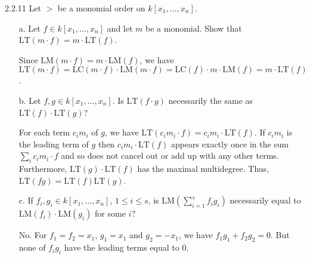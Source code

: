 \documentclass[12pt]{article}
\newcommand{\lt}{\text{LT}}
\newcommand{\lm}{\text{LM}}
\newcommand{\lc}{\text{LC}}
\begin{document}
2.2.11
Let $>$ be a monomial order on $k[x_1,\ldots, x_n].$
\begin{enumerate}
    \item[a.] Let $f\in k[x_1,\ldots, x_n]$ and let $m$ be a monomial. Show that $\text{LT}(m\cdot f)= m\cdot \text{LT}(f)$.
    \begin{mybox}
        Since $\lm(m\cdot f)=m\cdot\lm(f)$,
        we have $\lt(m\cdot f)=\lc(m\cdot f)\cdot
        \lm(m\cdot f)=\lc(f)\cdot m \cdot \lm(f)
        =m\cdot \lt(f)$.
    \end{mybox}
    \item[b.] Let $f,g\in k[x_1,\ldots, x_n]$. Is $\text{LT}(f\cdot g)$ necessarily the same as $\text{LT}(f)\cdot\text{LT}(g)$?
    \begin{mybox}
        For each term $c_im_i$ of $g$, we have
        $\lt(c_im_i\cdot f)= c_im_i\cdot\lt(f)$.
        If $c_im_i$ is the leading term of $g$ then
        $c_im_i\cdot\lt(f)$ appears exactly once in the
        sum $\sum_{i}{c_im_i\cdot f}$ and so does not
        cancel out or add up with any other terms. Furthermore,
        $\lt(g)\cdot\lt(f)$ has the maximal multidegree. Thus,
        $\lt(fg)=\lt(f)\lt(g)$.
    \end{mybox}
    \item[c.] If $f_i,g_i\in k[x_1,\ldots,x_n]$, $1\leq i \leq s$, is $\text{LM}(\sum_{i=1}^s f_ig_i)$ necessarily equal to $\text{LM}(f_i)\cdot \text{LM}(g_i)$ for some $i$?
    \begin{mybox}
        No. For $f_1=f_2=x_1$, $g_1=x_1$ and $g_2=-x_1$,
        we have $f_1g_1+f_2g_2=0$. But none of $f_ig_i$
        have the leading terms equal to 0.
    \end{mybox}
\end{enumerate}
\end{document}
